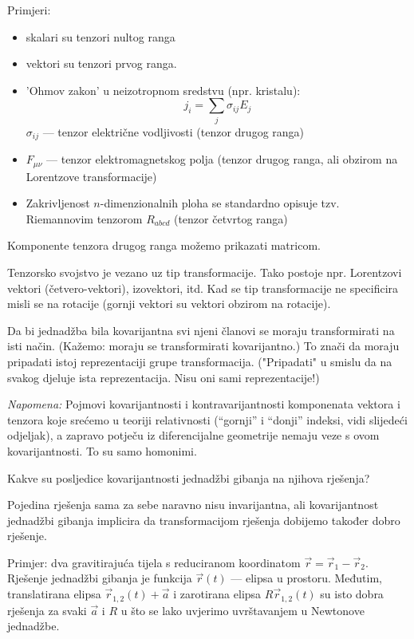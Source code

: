 Primjeri:
\begin{itemize}
\item skalari su tenzori nultog ranga
\item vektori su tenzori prvog ranga.
\item 'Ohmov zakon' u neizotropnom sredstvu (npr. kristalu): 
\begin{equation*}
j_i = \sum_j \sigma_{ij} E_j
\end{equation*}
$\sigma_{ij}$ --- tenzor električne vodljivosti (tenzor drugog ranga)

\item $F_{\mu\nu}$ --- tenzor elektromagnetskog polja (tenzor drugog
ranga, ali obzirom na Lorentzove transformacije)

\item Zakrivljenost $n$-dimenzionalnih ploha se standardno opisuje
tzv. Riemannovim tenzorom $R_{abcd}$  (tenzor četvrtog ranga)
\end{itemize}



 Komponente tenzora drugog ranga možemo prikazati matricom.

 Tenzorsko svojstvo je vezano uz tip transformacije. Tako postoje
npr. Lorentzovi vektori (četvero-vektori), izovektori, itd.  Kad se tip
transformacije ne specificira misli se na rotacije (gornji
vektori su vektori obzirom na rotacije). 

 Da bi jednadžba bila kovarijantna svi njeni članovi se moraju transformirati
na isti način. (Kažemo: moraju se transformirati kovarijantno.)
To znači da moraju pripadati istoj reprezentaciji grupe transformacija.
("Pripadati" u smislu da na svakog djeluje ista reprezentacija. Nisu oni
sami reprezentacije!)


\emph{Napomena:}  Pojmovi kovarijantnosti i kontravarijantnosti
komponenata vektora i tenzora koje srećemo u teoriji relativnosti
(``gornji'' i ``donji'' indeksi, vidi slijedeći odjeljak), a 
zapravo potječu iz diferencijalne 
geometrije nemaju veze s ovom kovarijantnosti.  To su samo homonimi.
 
 Kakve su posljedice kovarijantnosti jednadžbi gibanja na njihova
rješenja?

  Pojedina rješenja sama za sebe naravno nisu invarijantna, ali 
kovarijantnost jednadžbi gibanja implicira da transformacijom rješenja
dobijemo također dobro rješenje.

Primjer: dva gravitirajuća tijela s reduciranom koordinatom $\vec{r}
= \vec{r}_1 - \vec{r}_2$. 
Rješenje jednadžbi gibanja je funkcija $\vec{r}(t)$ --- elipsa u prostoru.
Međutim, translatirana elipsa $\vec{r}_{1,2}(t)+\vec{a}$ i zarotirana
elipsa $R\vec{r}_{1,2}(t)$ su isto dobra rješenja za svaki $\vec{a}$ i $R$
u što se lako uvjerimo uvrštavanjem u Newtonove jednadžbe.

